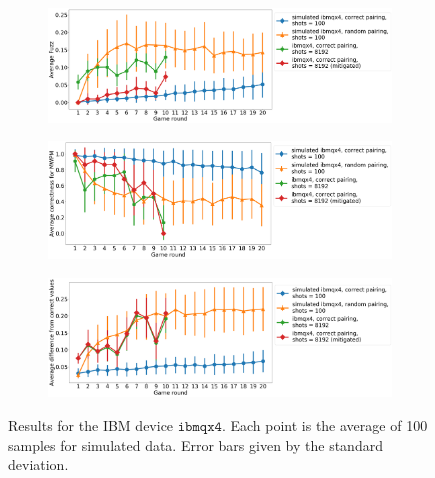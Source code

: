 \documentclass[aps,prl,twocolumn,showpacs,preprintnumbers]{revtex4-1}
\begin{document}
\begin{figure}
    \centering
    \begin{subfigure}[b]{\textwidth}
        \includegraphics[width=\textwidth]{figures/ibmqx4_fuzz.png}
    \end{subfigure}
    \begin{subfigure}[b]{\textwidth}
        \includegraphics[width=\textwidth]{figures/ibmqx4_mwpm.png}
    \end{subfigure}
    \begin{subfigure}[b]{\textwidth}
        \includegraphics[width=\textwidth]{figures/ibmqx4_diff.png}
    \end{subfigure}
    \caption{Results for the IBM device $\mathtt{ibmqx4}$. Each point is the average of 100 samples for simulated data. Error bars given by the standard deviation.}\label{fig:ibmqx4}
\end{figure}
\pagebreak
\end{document}
